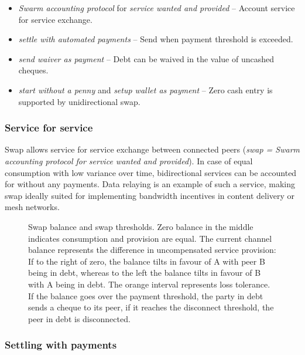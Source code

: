 \begin{itemize}
    \item \emph{Swarm accounting protocol} for \emph{service wanted and provided} -- Account service for service exchange.
    \item \emph{settle with automated payments} -- Send  when payment threshold is exceeded.
    \item \emph{send waiver as payment} -- Debt can be waived in the value of uncashed cheques. 
    \item \emph{start without a penny} and \emph{setup wallet as payment} -- Zero cash entry is supported by unidirectional swap.
\end{itemize}

\subsubsection{Service for service}

Swap allows service for service exchange between connected peers (\emph{swap = Swarm accounting protocol for service wanted and provided}). In case of equal consumption with low variance over time, bidirectional services can be accounted for without any payments. Data relaying is an example of such a service, making swap ideally suited for implementing bandwidth incentives in content delivery or mesh networks.

\begin{center}
\begin{figure}[htbp]

\caption[Swap balance and swap thresholds]{Swap balance and swap thresholds.
Zero balance in the middle indicates consumption and provision are equal.
The current channel balance represents the difference in uncompensated service provision:
If to the right of zero, the balance tilts in favour of A with peer B being in debt, whereas to the left
the balance tilts in favour of B with A being in debt.
The orange interval represents loss tolerance. If the balance goes over the payment threshold, the party in
debt sends a cheque to its peer, if it reaches the disconnect threshold, the peer in debt is disconnected.}
\label{fig:swap}
\end{figure}
\end{center}

\subsubsection{Settling with payments}

